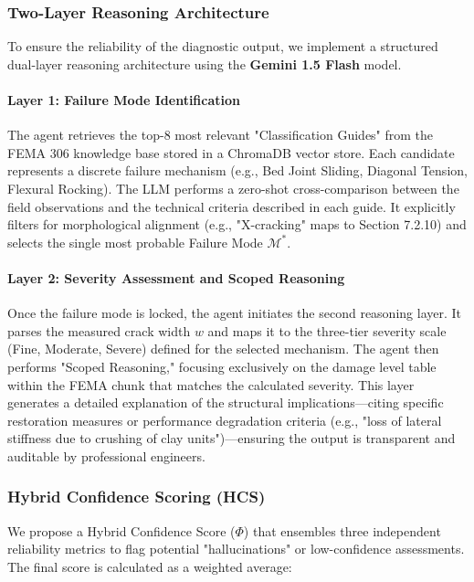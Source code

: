 \subsubsection{Two-Layer Reasoning Architecture}
\begin{sloppypar}
To ensure the reliability of the diagnostic output, we implement a structured dual-layer reasoning architecture using the \textbf{Gemini 1.5 Flash} model.
\end{sloppypar}

\paragraph{Layer 1: Failure Mode Identification}
\begin{sloppypar}
The agent retrieves the top-8 most relevant "Classification Guides" from the FEMA 306 knowledge base stored in a ChromaDB vector store. Each candidate represents a discrete failure mechanism (e.g., Bed Joint Sliding, Diagonal Tension, Flexural Rocking). The LLM performs a zero-shot cross-comparison between the field observations and the technical criteria described in each guide. It explicitly filters for morphological alignment (e.g., "X-cracking" maps to Section 7.2.10) and selects the single most probable Failure Mode $\mathcal{M}^*$.
\end{sloppypar}

\paragraph{Layer 2: Severity Assessment and Scoped Reasoning}
\begin{sloppypar}
Once the failure mode is locked, the agent initiates the second reasoning layer. It parses the measured crack width $w$ and maps it to the three-tier severity scale (Fine, Moderate, Severe) defined for the selected mechanism. The agent then performs "Scoped Reasoning," focusing exclusively on the damage level table within the FEMA chunk that matches the calculated severity. This layer generates a detailed explanation of the structural implications—citing specific restoration measures or performance degradation criteria (e.g., "loss of lateral stiffness due to crushing of clay units")—ensuring the output is transparent and auditable by professional engineers.
\end{sloppypar}

\subsubsection{Hybrid Confidence Scoring (HCS)}
\begin{sloppypar}
We propose a Hybrid Confidence Score ($\Phi$) that ensembles three independent reliability metrics to flag potential "hallucinations" or low-confidence assessments. The final score is calculated as a weighted average:
\end{sloppypar}

